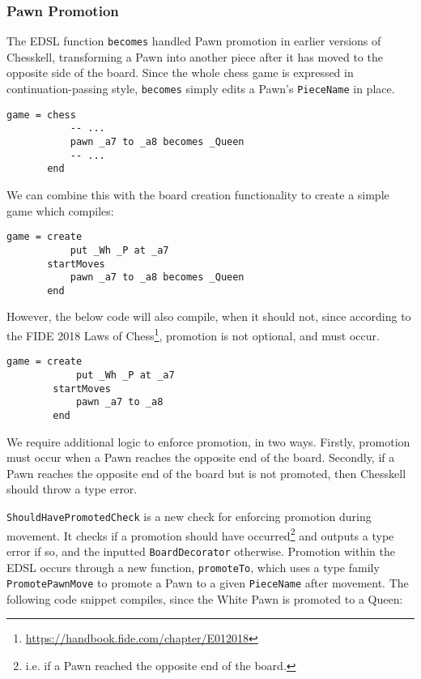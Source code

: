 \documentclass[12pt, a4paper, bibliography=totocnumbered]{scrartcl}
\begin{document}
\subsubsection{Pawn Promotion}

The EDSL function \lstinline[basicstyle=\ttfamily]{becomes} handled Pawn promotion in earlier versions of Chesskell, transforming a Pawn into another piece after it has moved to the opposite side of the board. Since the whole chess game is expressed in continuation-passing style, \lstinline[basicstyle=\ttfamily]{becomes} simply edits a Pawn's \lstinline[basicstyle=\ttfamily]{PieceName} in place. %

\begin{lstlisting}
game = chess
           -- ...
           pawn _a7 to _a8 becomes _Queen
           -- ...
       end
\end{lstlisting}

We can combine this with the board creation functionality to create a simple game which compiles:

\begin{lstlisting}
game = create
           put _Wh _P at _a7
       startMoves
           pawn _a7 to _a8 becomes _Queen
       end
\end{lstlisting}

However, the below code will also compile, when it should not, since according to the FIDE 2018 Laws of Chess\footnote{\url{https://handbook.fide.com/chapter/E012018}}, promotion is not optional, and must occur.

\begin{lstlisting}
game = create
            put _Wh _P at _a7
        startMoves
            pawn _a7 to _a8
        end
\end{lstlisting}

We require additional logic to enforce promotion, in two ways. Firstly, promotion must occur when a Pawn reaches the opposite end of the board. Secondly, if a Pawn reaches the opposite end of the board but is not promoted, then Chesskell should throw a type error.

\lstinline[basicstyle=\ttfamily]{ShouldHavePromotedCheck} is a new check for enforcing promotion during movement. It checks if a promotion should have occurred\footnote{i.e. if a Pawn reached the opposite end of the board.} and outputs a type error if so, and the inputted \lstinline[basicstyle=\ttfamily]{BoardDecorator} otherwise. Promotion within the EDSL occurs through a new function, \lstinline[basicstyle=\ttfamily]{promoteTo}, which uses a type family \lstinline[basicstyle=\ttfamily]{PromotePawnMove} to promote a Pawn to a given \lstinline[basicstyle=\ttfamily]{PieceName} after movement. The following code snippet compiles, since the White Pawn is promoted to a Queen:
\end{document}

